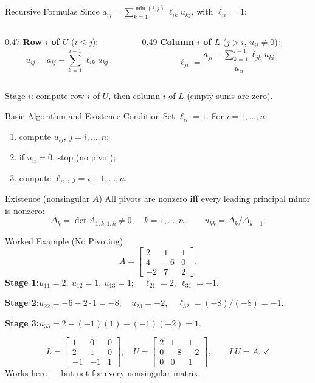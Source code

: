 \documentclass[11pt,aspectratio=169]{beamer}
\newcommand{\mat}[1]{\begin{bmatrix}#1\end{bmatrix}}
\begin{document}
\begin{frame}{Recursive Formulas}
  Since $a_{ij}=\sum_{k=1}^{\min(i,j)}\ell_{ik}u_{kj}$, with $\ell_{ii}=1$:
  \begin{columns}[T]
    \begin{column}{0.47\textwidth}
      \textbf{Row $i$ of $U$} ($i\le j$):
      \[
        \boxed{\,u_{ij}=a_{ij}-\sum_{k=1}^{i-1}\ell_{ik}u_{kj}\,}
      \]
    \end{column}
    \begin{column}{0.49\textwidth}
      \textbf{Column $i$ of $L$} ($j>i$, $u_{ii}\ne0$):
      \[
        \boxed{\,\ell_{ji}=\frac{a_{ji}-\sum_{k=1}^{i-1}\ell_{jk}u_{ki}}{u_{ii}}\,}
      \]
    \end{column}
  \end{columns}
  \medskip
  Stage $i$: compute row $i$ of $U$, then column $i$ of $L$ (empty sums are zero).
\end{frame}

\begin{frame}{Basic Algorithm and Existence Condition}
  Set $\ell_{ii}=1$. For $i=1,\dots,n$:
  \begin{enumerate}
    \item compute $u_{ij}$, $j=i,\dots,n$;
    \item if $u_{ii}=0$, stop (no pivot);
    \item compute $\ell_{ji}$, $j=i+1,\dots,n$.
  \end{enumerate}
  \begin{block}{Existence (nonsingular $A$)}
    All pivots are nonzero \textbf{iff} every leading principal minor is nonzero:
    \[
      \Delta_k=\det A_{1:k,1:k}\neq0,\quad k=1,\dots,n,
      \qquad u_{kk}=\Delta_k/\Delta_{k-1}.
    \]
  \end{block}
\end{frame}

\begin{frame}{Worked Example (No Pivoting)}
  \[
    A=\mat{2&1&1\\4&-6&0\\-2&7&2}.
  \]
  \textbf{Stage 1:}\quad $u_{11}=2,\ u_{12}=1,\ u_{13}=1;\quad \ell_{21}=2,\ \ell_{31}=-1.$
  \medskip

  \textbf{Stage 2:}\quad $u_{22}=-6-2\cdot1=-8,\quad u_{23}=-2,\quad \ell_{32}=(-8)/(-8)=-1.$
  \medskip

  \textbf{Stage 3:}\quad $u_{33}=2-(-1)(1)-(-1)(-2)=1.$
  \medskip

  \[
    L=\mat{1&0&0\\2&1&0\\-1&-1&1},\quad
    U=\mat{2&1&1\\0&-8&-2\\0&0&1},\qquad LU=A.\;\checkmark
  \]
  Works here --- but not for every nonsingular matrix.
\end{frame}
\end{document}
